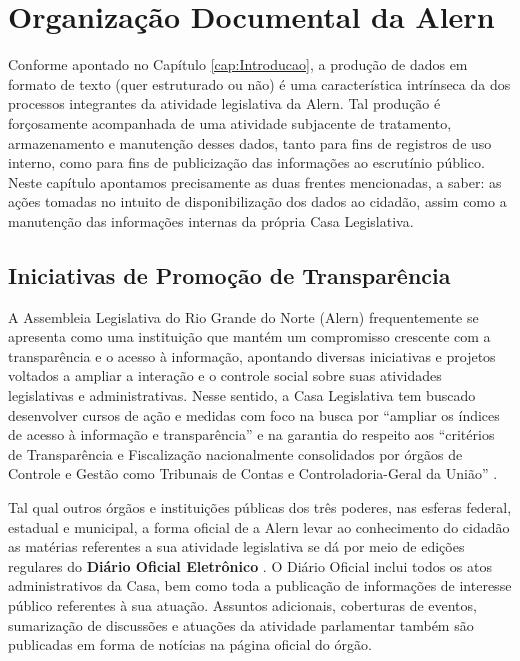 \chapter{Organização Documental da Alern}
\label{cap:DocAlern}

Conforme apontado no Capítulo \ref{cap:Introducao}, a produção de dados em formato de texto (quer estruturado ou não) é uma característica intrínseca da dos processos integrantes da atividade legislativa da \ac{Alern}. Tal produção é forçosamente acompanhada de uma atividade subjacente de tratamento, armazenamento e manutenção desses dados, tanto para fins de registros de uso interno, como para fins de publicização das informações ao escrutínio público. Neste capítulo apontamos precisamente as duas frentes mencionadas, a saber: as ações tomadas no intuito de disponibilização dos dados ao cidadão, assim como a manutenção das informações internas da própria Casa Legislativa.

\section{Iniciativas de Promoção de Transparência}
\label{sec:DocAlern.1}

A Assembleia Legislativa do Rio Grande do Norte (\ac{Alern}) frequentemente se  apresenta como uma instituição que mantém um compromisso crescente com a transparência e o acesso à informação, apontando diversas iniciativas e projetos voltados a ampliar a interação e o controle social sobre suas atividades legislativas e administrativas. Nesse sentido, a Casa Legislativa tem buscado desenvolver cursos de ação e medidas com foco na busca por ``ampliar os índices de acesso à informação e transparência'' e na garantia do respeito aos ``critérios de Transparência e Fiscalização nacionalmente consolidados por órgãos de Controle e Gestão como Tribunais de Contas e Controladoria-Geral da União'' \cite{ALERN:1}.

Tal qual outros órgãos e instituições públicas dos três poderes, nas esferas federal, estadual e municipal, a forma oficial de a \ac{Alern} levar ao conhecimento do cidadão as matérias referentes a sua atividade legislativa se dá por meio de edições regulares do \textbf{Diário Oficial Eletrônico} \cite{ALERN:4}. O Diário Oficial inclui todos os atos administrativos da Casa, bem como toda a publicação de informações de interesse público referentes à sua atuação. Assuntos adicionais, coberturas de eventos, sumarização de discussões e atuações da atividade parlamentar também são publicadas em forma de notícias na página oficial do órgão.

